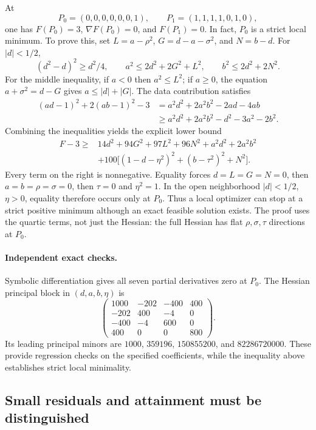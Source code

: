 \documentclass[11pt]{article}
\theoremstyle{remark}
\begin{document}
At
\[
 P_0=(0,0,0,0,0,0,1),\qquad
 P_1=(1,1,1,1,0,1,0),
\]
one has $F(P_0)=3$, $\nabla F(P_0)=0$, and $F(P_1)=0$.
In fact, $P_0$ is a strict local minimum.  To prove this, set
$L=a-\rho^2$, $G=d-a-\sigma^2$, and $N=b-d$.
For $|d|<1/2$,
\[
 (d^2-d)^2\geq d^2/4,\qquad
 a^2\leq 2d^2+2G^2+L^2,\qquad
 b^2\leq 2d^2+2N^2.
\]
For the middle inequality, if $a<0$ then $a^2\leq L^2$;
if $a\geq0$, the equation $a+\sigma^2=d-G$ gives
$a\leq |d|+|G|$.  The data contribution satisfies
\begin{align*}
 (ad-1)^2+2(ab-1)^2-3
 &=a^2d^2+2a^2b^2-2ad-4ab\\
 &\geq a^2d^2+2a^2b^2-d^2-3a^2-2b^2.
\end{align*}
Combining the inequalities yields the explicit lower bound
\begin{align*}
 F-3\geq{}&14d^2+94G^2+97L^2+96N^2+a^2d^2+2a^2b^2\\
 &+100\bigl[(1-d-\eta^2)^2+(b-\tau^2)^2+N^2\bigr].
\end{align*}
Every term on the right is nonnegative.  Equality forces
$d=L=G=N=0$, then $a=b=\rho=\sigma=0$, then $\tau=0$
and $\eta^2=1$.  In the open neighborhood $|d|<1/2$, $\eta>0$,
equality therefore occurs only at $P_0$.
Thus a local optimizer can stop at a strict positive minimum although an
exact feasible solution exists.  The proof uses the quartic terms, not
just the Hessian: the full Hessian has flat $\rho,\sigma,\tau$
directions at $P_0$.

\paragraph{Independent exact checks.}
Symbolic differentiation gives all seven partial derivatives zero at
$P_0$.  The Hessian principal block in $(d,a,b,\eta)$ is
\[
 \begin{pmatrix}
 1000&-202&-400&400\\
 -202&400&-4&0\\
 -400&-4&600&0\\
 400&0&0&800
 \end{pmatrix}.
\]
Its leading principal minors are
$1000$, $359196$, $150855200$, and $82286720000$.
These provide regression checks on the specified coefficients, while the
inequality above establishes strict local minimality.

\subsection{Small residuals and attainment must be distinguished}
\end{document}
